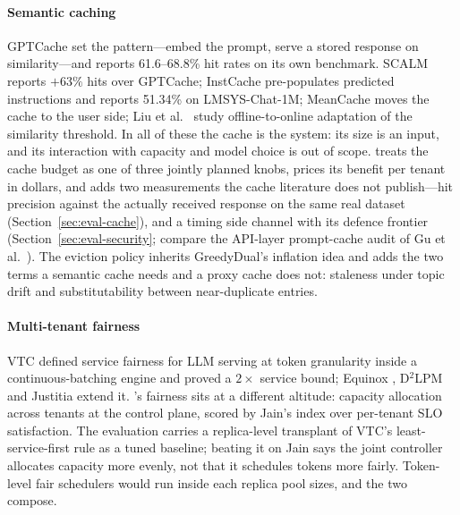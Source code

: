 \paragraph{Semantic caching}
GPTCache \citep{gptcache2023} set the pattern---embed the prompt, serve a
stored response on similarity---and reports 61.6--68.8\% hit rates on its
own benchmark. SCALM \citep{scalm2024} reports $+63\%$ hits over GPTCache;
InstCache \citep{instcache2024} pre-populates predicted instructions and
reports 51.34\% on LMSYS-Chat-1M; MeanCache \citep{meancache2024} moves the
cache to the user side; Liu et al.~\citep{semcacheadapt2025} study offline-to-online
adaptation of the similarity threshold. In all of these the cache is the
system: its size is an input, and its interaction with capacity and model
choice is out of scope. \polyforge{} treats the cache budget as one of three
jointly planned knobs, prices its benefit per tenant in dollars, and adds
two measurements the cache literature does not publish---hit precision
against the actually received response on the same real dataset
(Section~\ref{sec:eval-cache}), and a timing side channel with its defence
frontier (Section~\ref{sec:eval-security}; compare the API-layer
prompt-cache audit of Gu et al.~\citep{promptcacheaudit2025}). The eviction policy
inherits GreedyDual's inflation idea \citep{cao1997greedydual} and adds
the two terms a semantic cache needs and a proxy cache does not: staleness
under topic drift and substitutability between near-duplicate entries.

\paragraph{Multi-tenant fairness}
VTC \citep{vtc2024} defined service fairness for LLM serving at token
granularity inside a continuous-batching engine and proved a $2\times$
service bound; Equinox \citep{equinox2025}, D$^2$LPM \citep{d2lpm2025} and
Justitia \citep{justitia2025} extend it. \polyforge{}'s fairness sits at a
different altitude: capacity allocation across tenants at the control
plane, scored by Jain's index \citep{jain1984} over per-tenant SLO
satisfaction. The evaluation carries a replica-level transplant of VTC's
least-service-first rule as a tuned baseline; beating it on Jain says the
joint controller allocates capacity more evenly, not that it schedules
tokens more fairly. Token-level fair schedulers would run inside each
replica pool \polyforge{} sizes, and the two compose.


